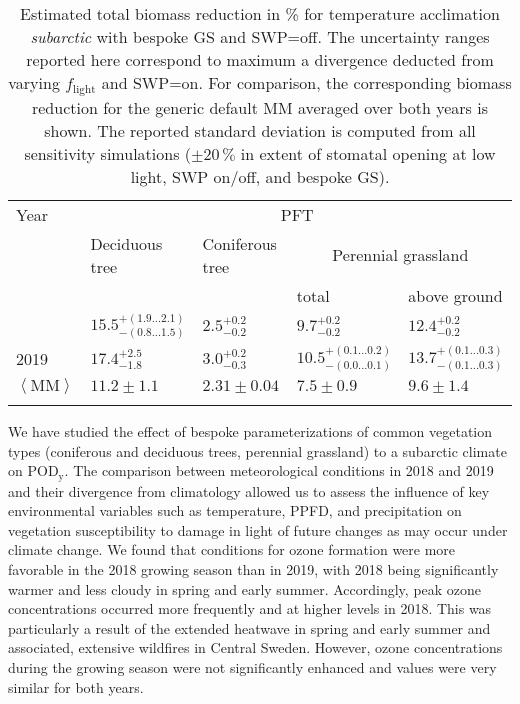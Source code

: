 \documentclass[bg, manuscript]{copernicus}
\begin{document}
\begin{table}[t]
  \caption{Estimated total biomass reduction in \unit{\%} for temperature acclimation \emph{subarctic} with bespoke GS and SWP=off. The uncertainty ranges reported here correspond to maximum a divergence deducted from varying $f_\mathrm{light}$ and SWP=on. For comparison, the corresponding biomass reduction for the generic default MM averaged over both years is shown. The reported standard deviation is computed from all sensitivity simulations ($\pm 20\,\unit{\%}$ in extent of stomatal opening at low light, SWP on/off, and bespoke GS).}
  \label{tab:biomass_reduction}
\begin{tabular}{lllll}
\tophline
Year & \multicolumn{4}{c}{PFT}\\
& Deciduous tree& Coniferous tree & \multicolumn{2}{c}{Perennial grassland}\\
& & & total & above ground\\
\middlehline
2018 & $15.5^{+(1.9...2.1)}_{-(0.8...1.5)}$ & $2.5^{+0.2}_{-0.2}$ & $9.7^{+0.2}_{-0.2}$ & $12.4^{+0.2}_{-0.2}$\\
2019 & $17.4^{+2.5}_{-1.8}$ & $3.0^{+0.2}_{-0.3}$ & $10.5^{+(0.1...0.2)}_{-(0.0...0.1)}$ & $13.7^{+(0.1...0.3)}_{-(0.1...0.3)}$\\
\middlehline
$\left<\mathrm{MM}\right>$ & $11.2\pm 1.1$ & $2.31\pm 0.04$ & $7.5\pm 0.9$ & $9.6\pm 1.4$\\
\bottomhline
\end{tabular}
\end{table}


\label{sec:conc}

We have studied the effect of bespoke parameterizations of common vegetation types (coniferous and deciduous trees, perennial grassland) to a subarctic climate on $\mathrm{POD_y}$. The comparison between meteorological conditions in 2018 and 2019 and their divergence from climatology allowed us to assess the influence of key environmental variables such as temperature, PPFD, and precipitation on vegetation susceptibility to  damage in light of future changes as may occur under climate change. We found that conditions for ozone formation were more favorable in the 2018 growing season than in 2019, with 2018 being significantly warmer and less cloudy in spring and early summer. Accordingly, peak ozone concentrations occurred more frequently and at higher levels in 2018. This was particularly a result of the extended heatwave in spring and early summer and associated, extensive wildfires in Central Sweden. However, ozone concentrations during the growing season were not significantly enhanced and  values were very similar for both years.
\end{document}
